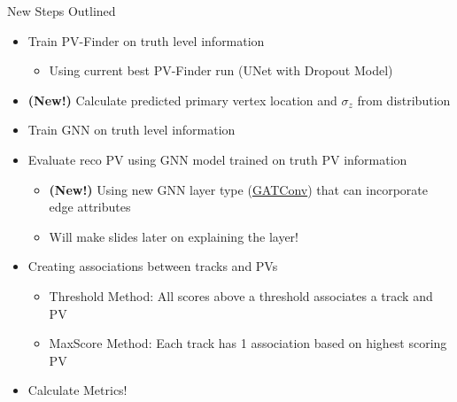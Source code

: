 \documentclass[xcolor=table,aspectratio=169]{beamer}
\begin{document}
\begin{frame}{New Steps Outlined}
    \begin{itemize}
        \item Train PV-Finder on truth level information
        \begin{itemize}
            \item Using current best PV-Finder run (UNet with Dropout Model)
        \end{itemize}
        \item \textbf{(New!)} Calculate predicted primary vertex location and \(\sigma_z\) from distribution
        \item Train GNN on truth level information
        \item Evaluate reco PV using GNN model trained on truth PV information
        \begin{itemize}
            \item \textbf{(New!)} Using new GNN layer type (\href{pytorch-geometric.readthedocs.io/en/2.5.3/generated/torch_geometric.nn.conv.GATConv.html}{GATConv}) that can incorporate edge attributes
            \item Will make slides later on explaining the layer!
        \end{itemize}
        \item Creating associations between tracks and PVs
        \begin{itemize}
            \item Threshold Method: All scores above a threshold associates a track and PV
            \item MaxScore Method: Each track has 1 association based on highest scoring PV
        \end{itemize}
        \item Calculate Metrics!
    \end{itemize}
\end{frame}
\end{document}
